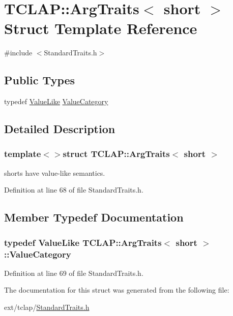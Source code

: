 \hypertarget{struct_t_c_l_a_p_1_1_arg_traits_3_01short_01_4}{}\section{T\+C\+L\+A\+P\+:\+:Arg\+Traits$<$ short $>$ Struct Template Reference}
\label{struct_t_c_l_a_p_1_1_arg_traits_3_01short_01_4}


{\ttfamily \#include $<$Standard\+Traits.\+h$>$}

\subsection*{Public Types}
\begin{DoxyCompactItemize}
\item 
typedef \hyperlink{struct_t_c_l_a_p_1_1_value_like}{Value\+Like} \hyperlink{struct_t_c_l_a_p_1_1_arg_traits_3_01short_01_4_a99f5d76501b120d6455b528aa7bf6896}{Value\+Category}
\end{DoxyCompactItemize}


\subsection{Detailed Description}
\subsubsection*{template$<$$>$struct T\+C\+L\+A\+P\+::\+Arg\+Traits$<$ short $>$}

shorts have value-\/like semantics. 

Definition at line 68 of file Standard\+Traits.\+h.



\subsection{Member Typedef Documentation}
\hypertarget{struct_t_c_l_a_p_1_1_arg_traits_3_01short_01_4_a99f5d76501b120d6455b528aa7bf6896}{}
\subsubsection[{Value\+Category}]{\setlength{\rightskip}{0pt plus 5cm}typedef {\bf Value\+Like} {\bf T\+C\+L\+A\+P\+::\+Arg\+Traits}$<$ short $>$\+::{\bf Value\+Category}}\label{struct_t_c_l_a_p_1_1_arg_traits_3_01short_01_4_a99f5d76501b120d6455b528aa7bf6896}


Definition at line 69 of file Standard\+Traits.\+h.



The documentation for this struct was generated from the following file\+:\begin{DoxyCompactItemize}
\item 
ext/tclap/\hyperlink{_standard_traits_8h}{Standard\+Traits.\+h}\end{DoxyCompactItemize}
